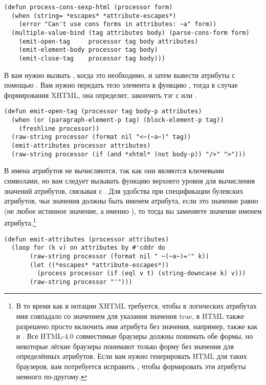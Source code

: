 \begin{lstlisting}
(defun process-cons-sexp-html (processor form)
  (when (string= *escapes* *attribute-escapes*)
    (error "Can't use cons forms in attributes: ~a" form))
  (multiple-value-bind (tag attributes body) (parse-cons-form form)
    (emit-open-tag     processor tag body attributes)
    (emit-element-body processor tag body)
    (emit-close-tag    processor tag body)))
\end{lstlisting}

В  вам нужно вызвать , когда это необходимо, и затем
вывести атрибуты с помощью . Вам нужно передать тело элемента в
функцию , тогда в случае формирования XHTML, она определит, закончить
тэг с \code{/>} или \code{>}.

\begin{lstlisting}
(defun emit-open-tag (processor tag body-p attributes)
  (when (or (paragraph-element-p tag) (block-element-p tag))
    (freshline processor))
  (raw-string processor (format nil "<~(~a~)" tag))
  (emit-attributes processor attributes)
  (raw-string processor (if (and *xhtml* (not body-p)) "/>" ">")))
\end{lstlisting}

В  имена атрибутов не вычисляются, так как они являются ключевыми
символами, но вам следует вызывать функцию  верхнего уровня для вычисления
значений атрибутов, связывая  с . Для удобства
при спецификации булевских атрибутов, чьи значения должны быть именем атрибута, если это
значение равно  (не любое истинное значение, а именно ), то тогда вы
заменяете значение именем атрибута.\footnote{В то время как в нотации XHTML требуется,
  чтобы в логических атрибутах имя совпадало со значением для указания значения true, в
  HTML также разрешено просто включить имя атрибута без значения, например,  также как и . Все HTML-4.0 совместимые
  браузеры должны понимать обе формы, но некоторые лёгкие браузеры понимают только форму
  без значения для определённых атрибутов. Если вам нужно генерировать HTML для таких
  браузеров, вам потребуется исправить , чтобы формировать эти
  атрибуты немного по-другому.}

\begin{lstlisting}
(defun emit-attributes (processor attributes)
  (loop for (k v) on attributes by #'cddr do
       (raw-string processor (format nil " ~(~a~)='" k))
       (let ((*escapes* *attribute-escapes*))
         (process processor (if (eql v t) (string-downcase k) v)))
       (raw-string processor "'")))
\end{lstlisting}

